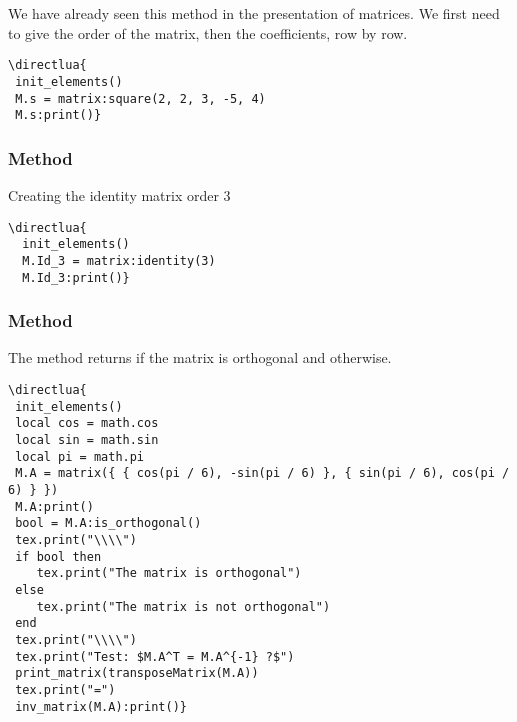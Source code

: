 We have already seen this method in the presentation of matrices. We first need to give the order of the matrix, then the coefficients, row by row.

\begin{minipage}{.5\textwidth}
\begin{verbatim}
\directlua{
 init_elements()
 M.s = matrix:square(2, 2, 3, -5, 4)
 M.s:print()}
\end{verbatim}
\end{minipage}
\begin{minipage}{.5\textwidth}
\end{minipage}


\subsubsection{Method }%
\label{ssub:method_identity}

Creating the identity matrix order 3


\begin{minipage}{.5\textwidth}
\begin{verbatim}
\directlua{
  init_elements()
  M.Id_3 = matrix:identity(3)
  M.Id_3:print()}
\end{verbatim}
\end{minipage}
\begin{minipage}{.5\textwidth}
\end{minipage}

\subsubsection{Method  } %
\label{ssub:method_is_orthogonal}

The method returns  if the matrix is orthogonal and  otherwise.

\begin{verbatim}
\directlua{
 init_elements()
 local cos = math.cos
 local sin = math.sin
 local pi = math.pi
 M.A = matrix({ { cos(pi / 6), -sin(pi / 6) }, { sin(pi / 6), cos(pi / 6) } })
 M.A:print()
 bool = M.A:is_orthogonal()
 tex.print("\\\\")
 if bool then
 	tex.print("The matrix is orthogonal")
 else
 	tex.print("The matrix is not orthogonal")
 end
 tex.print("\\\\")
 tex.print("Test: $M.A^T = M.A^{-1} ?$")
 print_matrix(transposeMatrix(M.A))
 tex.print("=")
 inv_matrix(M.A):print()}
\end{verbatim}

